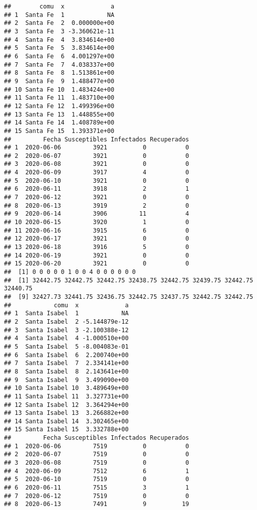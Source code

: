 \documentclass[
]{article}
\begin{document}
\begin{verbatim}
##        comu  x             a
## 1  Santa Fe  1            NA
## 2  Santa Fe  2  0.000000e+00
## 3  Santa Fe  3 -3.360621e-11
## 4  Santa Fe  4  3.834614e+00
## 5  Santa Fe  5  3.834614e+00
## 6  Santa Fe  6  4.001297e+00
## 7  Santa Fe  7  4.038337e+00
## 8  Santa Fe  8  1.513861e+00
## 9  Santa Fe  9  1.488477e+00
## 10 Santa Fe 10  1.483424e+00
## 11 Santa Fe 11  1.483710e+00
## 12 Santa Fe 12  1.499396e+00
## 13 Santa Fe 13  1.448855e+00
## 14 Santa Fe 14  1.408789e+00
## 15 Santa Fe 15  1.393371e+00
##         Fecha Susceptibles Infectados Recuperados
## 1  2020-06-06         3921          0           0
## 2  2020-06-07         3921          0           0
## 3  2020-06-08         3921          0           0
## 4  2020-06-09         3917          4           0
## 5  2020-06-10         3921          0           0
## 6  2020-06-11         3918          2           1
## 7  2020-06-12         3921          0           0
## 8  2020-06-13         3919          2           0
## 9  2020-06-14         3906         11           4
## 10 2020-06-15         3920          1           0
## 11 2020-06-16         3915          6           0
## 12 2020-06-17         3921          0           0
## 13 2020-06-18         3916          5           0
## 14 2020-06-19         3921          0           0
## 15 2020-06-20         3921          0           0
##  [1] 0 0 0 0 0 1 0 0 4 0 0 0 0 0 0
##  [1] 32442.75 32442.75 32442.75 32438.75 32442.75 32439.75 32442.75 32440.75
##  [9] 32427.73 32441.75 32436.75 32442.75 32437.75 32442.75 32442.75
##            comu  x             a
## 1  Santa Isabel  1            NA
## 2  Santa Isabel  2 -5.144879e-12
## 3  Santa Isabel  3 -2.100388e-12
## 4  Santa Isabel  4 -1.000510e+00
## 5  Santa Isabel  5 -8.004083e-01
## 6  Santa Isabel  6  2.200740e+00
## 7  Santa Isabel  7  2.334141e+00
## 8  Santa Isabel  8  2.143641e+00
## 9  Santa Isabel  9  3.499090e+00
## 10 Santa Isabel 10  3.489649e+00
## 11 Santa Isabel 11  3.327731e+00
## 12 Santa Isabel 12  3.364294e+00
## 13 Santa Isabel 13  3.266882e+00
## 14 Santa Isabel 14  3.302465e+00
## 15 Santa Isabel 15  3.332788e+00
##         Fecha Susceptibles Infectados Recuperados
## 1  2020-06-06         7519          0           0
## 2  2020-06-07         7519          0           0
## 3  2020-06-08         7519          0           0
## 4  2020-06-09         7512          6           1
## 5  2020-06-10         7519          0           0
## 6  2020-06-11         7515          3           1
## 7  2020-06-12         7519          0           0
## 8  2020-06-13         7491          9          19

\end{verbatim}
\end{document}
